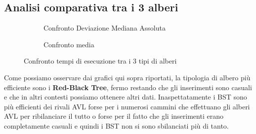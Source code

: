 \documentclass[a4paper,titlepage]{article}
\begin{document}
\subsection{Analisi comparativa tra i 3 alberi}

\begin{figure}[h]
  \centering
  \begin{subfigure}{\textwidth}
    \captionsetup{justification=centering}
     \caption{Confronto Deviazione Mediana Assoluta}
     \label{fig:bst_avl_rbt_median}
  \end{subfigure}%
  \vspace{2pt}
  \begin{subfigure}{\textwidth}
    \captionsetup{justification=centering}
    \caption{Confronto media}
     \label{fig:bst_avl_rbt_mean}
  \end{subfigure}
  \caption{Confronto tempi di esecuzione tra i 3 tipi di alberi}
\end{figure}

Come possiamo osservare dai grafici qui sopra riportati, la tipologia di albero più efficiente sono i \textbf{Red-Black Tree}, fermo restando che gli inserimenti sono casuali e che in altri contesti possiamo ottenere altri dati. Inaspettatamente i BST sono più efficienti dei rivali AVL forse per i numerosi cammini che effettuano gli alberi AVL per ribilanciare il tutto o forse per il fatto che gli inserimenti erano completamente casuali e quindi i BST non si sono sbilanciati più di tanto.
\newpage
\end{document}
